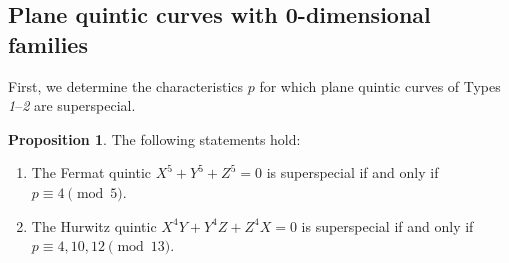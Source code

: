 \documentclass{article}
\theoremstyle{definition}
\newtheorem{Prop}[Def]{Proposition}
\begin{document}
\subsection{Plane quintic curves with 0-dimensional families}\label{subsec:type1-5}\vspace{0.5mm}
First, we determine the characteristics $p$ for which plane quintic curves of Types \hspace{-0.2mm}\textit{1}--\textit{2} are superspecial.\vspace{-1mm}
\begin{Prop}\label{prop:type1-2}
The following statements hold:\vspace{-0.6mm}
\begin{enumerate}
\item[(1)] The Fermat quintic $X^5+Y^5+Z^5 = 0$ is superspecial if and only if $p \equiv 4 \pmod{5}$.\vspace{-2.6mm}
\item[(2)] The Hurwitz quintic $X^4Y+Y^4Z+Z^4X = 0$ is superspecial if and only if $p \equiv 4,10,12 \pmod{13}$.\vspace{0.3mm}
\end{enumerate}
\end{Prop}
\end{document}
